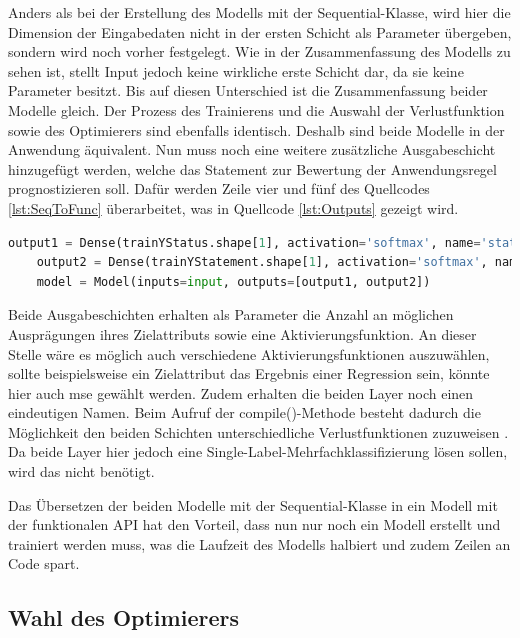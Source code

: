Anders als bei der Erstellung des Modells mit der \glqq Sequential\grqq{}-Klasse, wird hier die Dimension der Eingabedaten nicht in der ersten Schicht als Parameter übergeben,
sondern wird noch vorher festgelegt. Wie in der Zusammenfassung des Modells zu sehen ist, stellt \glqq Input\grqq{} jedoch keine wirkliche erste Schicht dar,
da sie keine Parameter besitzt. Bis auf diesen Unterschied ist die Zusammenfassung beider Modelle gleich. Der Prozess des Trainierens und die Auswahl der Verlustfunktion
sowie des Optimierers sind ebenfalls identisch. Deshalb sind beide Modelle in der Anwendung äquivalent. Nun muss noch eine weitere zusätzliche Ausgabeschicht hinzugefügt werden,
welche das Statement zur Bewertung der Anwendungsregel prognostizieren soll. Dafür werden Zeile vier und fünf des Quellcodes \ref*{lst:SeqToFunc} überarbeitet, was 
in Quellcode \ref*{lst:Outputs} gezeigt wird.

\begin{lstlisting}[language = python, caption={Zweite Ausgabeschicht hinzufügen},captionpos=b, label = lst:Outputs, floatplacement=H]
    output1 = Dense(trainYStatus.shape[1], activation='softmax', name='status')(x)
    output2 = Dense(trainYStatement.shape[1], activation='softmax', name='statement')(x)
    model = Model(inputs=input, outputs=[output1, output2])
\end{lstlisting}

Beide Ausgabeschichten erhalten als Parameter die Anzahl an möglichen Ausprägungen ihres Zielattributs sowie eine Aktivierungsfunktion. An dieser Stelle wäre es möglich
auch verschiedene Aktivierungsfunktionen auszuwählen, sollte beispielsweise ein Zielattribut das Ergebnis einer Regression sein, könnte hier auch 
\glqq mse\grqq{} gewählt werden. Zudem erhalten die beiden Layer noch einen eindeutigen Namen. Beim Aufruf der compile()-Methode besteht dadurch die Möglichkeit 
den beiden Schichten unterschiedliche Verlustfunktionen zuzuweisen \cite[vgl. S.308f.]{DL_PY}. Da beide Layer hier jedoch eine Single-Label-Mehrfachklassifizierung lösen sollen,
wird das nicht benötigt. 

Das Übersetzen der beiden Modelle mit der \glqq Sequential\grqq{}-Klasse in ein Modell mit der funktionalen \ac{API} hat den Vorteil, dass nun nur noch ein Modell 
erstellt und trainiert werden muss, was die Laufzeit des Modells halbiert und zudem Zeilen an Code spart.

\subsection{Wahl des Optimierers}

